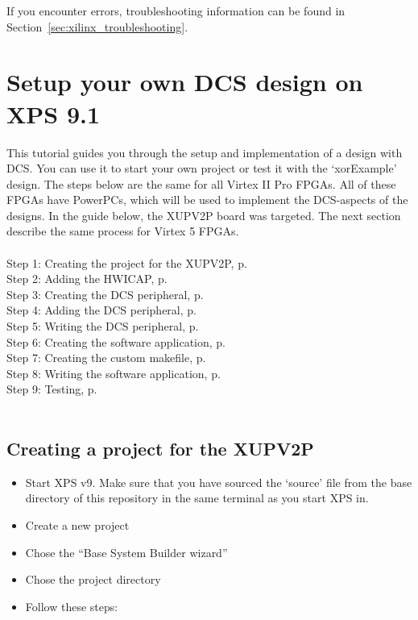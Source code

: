 \documentclass[a4paper,oneside]{memoir}
\begin{document}
If you encounter errors, troubleshooting information can be found in Section~\ref{sec:xilinx_troubleshooting}.

\section{Setup your own DCS design on XPS 9.1}\label{sec:XPS9}
This tutorial guides you through the setup and implementation of a design with DCS. You can use it to start your own project or test it with the `xorExample' design. The steps below are the same for all Virtex II Pro FPGAs. All of these FPGAs have PowerPCs, which will be used to implement the DCS-aspects of the designs. In the guide below, the XUPV2P board was targeted. The next section describe the same process for Virtex 5 FPGAs.\\
\\
Step 1: Creating the project for the XUPV2P, p.\ \pageref{sec:creating_proj}\\
Step 2: Adding the HWICAP, p.\ \pageref{sec:adding_hwicap}\\
Step 3: Creating the DCS peripheral, p.\ \pageref{sec:creating_peripheral}\\
Step 4: Adding the DCS peripheral, p.\ \pageref{sec:adding_peripheral}\\
Step 5: Writing the DCS peripheral, p.\ \pageref{sec:writing_peripheral}\\
Step 6: Creating the software application, p.\ \pageref{sec:creating_software}\\
Step 7: Creating the custom makefile, p.\ \pageref{sec:creating_makefile}\\
Step 8: Writing the software application, p.\ \pageref{sec:writing_software}\\
Step 9: Testing, p.\ \pageref{sec:testing}\\
\\



\subsection{Creating a project for the XUPV2P}\label{sec:creating_proj}

\begin{itemize}
\item Start XPS v9. Make sure that you have sourced the `source' file from the base directory of this repository in the same terminal as you start XPS in.
\item    Create a new project
\item    Chose the ``Base System Builder wizard''
\item    Chose the project directory
\item    Follow these steps:
\end{itemize}
\end{document}
